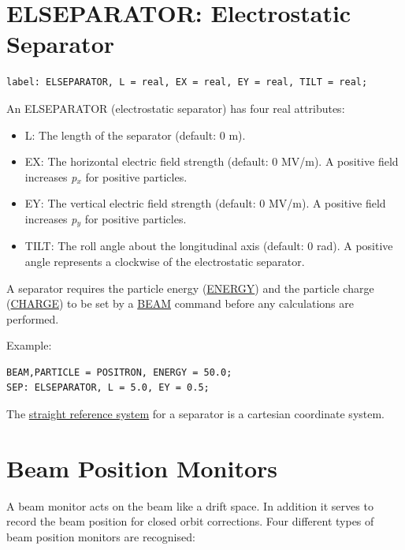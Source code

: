

%
\section{ELSEPARATOR: Electrostatic Separator}
\label{sec:separator}

\begin{verbatim}
label: ELSEPARATOR, L = real, EX = real, EY = real, TILT = real;
\end{verbatim} 

An ELSEPARATOR (electrostatic separator) has four real attributes: 
\begin{itemize}
   \item L: The length of the separator (default: 0 m). 
   \item EX: The horizontal electric field strength (default: 0 MV/m). 
     A positive field increases \textit{p$_x$} for positive particles.  
   \item EY: The vertical electric field strength (default: 0 MV/m). 
     A positive field increases \textit{p$_y$} for positive particles.  
   \item TILT: The roll angle about the longitudinal axis (default: 0
     rad). A positive angle represents a clockwise of the electrostatic
     separator.  
\end{itemize} 

A separator requires the particle energy
(\href{beam.html#energy}{ENERGY}) and the particle charge
(\href{beam.html#charge}{CHARGE}) to be set by a \href{beam.html}{BEAM}
command before any calculations are performed.  

Example: 
\begin{verbatim}
BEAM,PARTICLE = POSITRON, ENERGY = 50.0;
SEP: ELSEPARATOR, L = 5.0, EY = 0.5;
\end{verbatim} 

The \href{local_system.html#straight}{straight reference system} for a
separator is a cartesian coordinate system.   


%
\section{Beam Position Monitors}
\label{sec:monitors}

A beam monitor acts on the beam like a drift space. In addition it
serves to record the beam position for closed orbit corrections. Four
different types of beam position monitors are recognised:  

